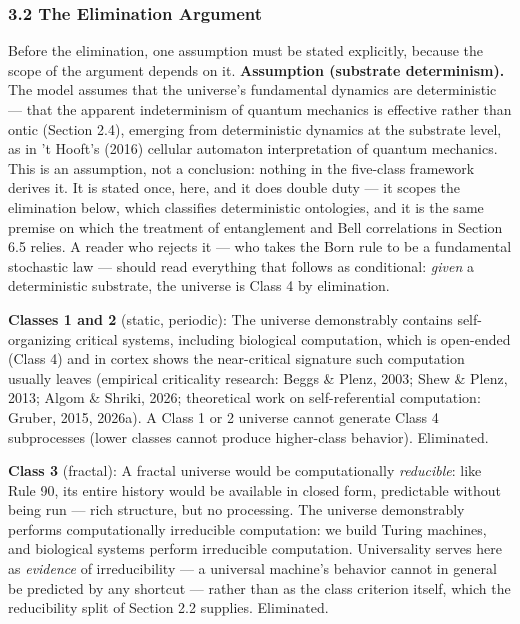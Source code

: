 \documentclass[
]{article}
\begin{document}
\hypertarget{the-elimination-argument}{%
\subsubsection{3.2 The Elimination
Argument}\label{the-elimination-argument}}

Before the elimination, one assumption must be stated explicitly,
because the scope of the argument depends on it. \textbf{Assumption
(substrate determinism).} The model assumes that the universe's
fundamental dynamics are deterministic --- that the apparent
indeterminism of quantum mechanics is effective rather than ontic
(Section 2.4), emerging from deterministic dynamics at the substrate
level, as in 't Hooft's (2016) cellular automaton interpretation of
quantum mechanics. This is an assumption, not a conclusion: nothing in
the five-class framework derives it. It is stated once, here, and it
does double duty --- it scopes the elimination below, which classifies
deterministic ontologies, and it is the same premise on which the
treatment of entanglement and Bell correlations in Section 6.5 relies. A
reader who rejects it --- who takes the Born rule to be a fundamental
stochastic law --- should read everything that follows as conditional:
\emph{given} a deterministic substrate, the universe is Class 4 by
elimination.

\textbf{Classes 1 and 2} (static, periodic): The universe demonstrably
contains self-organizing critical systems, including biological
computation, which is open-ended (Class 4) and in cortex shows the
near-critical signature such computation usually leaves (empirical
criticality research: Beggs \& Plenz, 2003; Shew \& Plenz, 2013; Algom
\& Shriki, 2026; theoretical work on self-referential computation:
Gruber, 2015, 2026a). A Class 1 or 2 universe cannot generate Class 4
subprocesses (lower classes cannot produce higher-class behavior).
Eliminated.

\textbf{Class 3} (fractal): A fractal universe would be computationally
\emph{reducible}: like Rule 90, its entire history would be available in
closed form, predictable without being run --- rich structure, but no
processing. The universe demonstrably performs computationally
irreducible computation: we build Turing machines, and biological
systems perform irreducible computation. Universality serves here as
\emph{evidence} of irreducibility --- a universal machine's behavior
cannot in general be predicted by any shortcut --- rather than as the
class criterion itself, which the reducibility split of Section 2.2
supplies. Eliminated.
\end{document}

